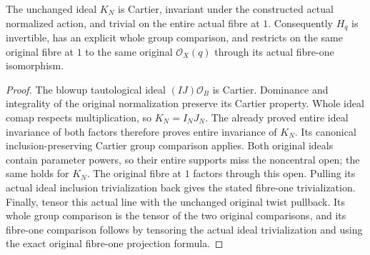 \begin{theorem}
\label{thm:pl-original-normalized-tautological-product-line-action-fibre-one}
\leanok
{}
The unchanged ideal $K_N$ is Cartier, invariant under the constructed
actual normalized action, and trivial on the entire actual fibre at $1$.
Consequently $H_q$ is invertible, has an explicit whole group comparison,
and restricts on the same original fibre at $1$ to the same original
$\mathcal O_X(q)$ through its actual fibre-one isomorphism.
\end{theorem}
\begin{proof}
\leanok
The blowup tautological ideal $(IJ)\mathcal O_B$ is Cartier. Dominance and
integrality of the original normalization preserve its Cartier property.
Whole ideal comap respects multiplication, so
$K_N=I_NJ_N$. The already proved entire ideal invariance of both factors
therefore proves entire invariance of $K_N$. Its canonical
inclusion-preserving Cartier group comparison applies. Both original
ideals contain parameter powers, so their entire supports miss the
noncentral open; the same holds for $K_N$. The original fibre at $1$
factors through this open. Pulling its actual ideal inclusion
trivialization back gives the stated fibre-one trivialization. Finally,
tensor this actual line with the unchanged original twist pullback.
Its whole group comparison is the tensor of the two original comparisons,
and its fibre-one comparison follows by tensoring the actual ideal
trivialization and using the exact original fibre-one projection formula.
\end{proof}

